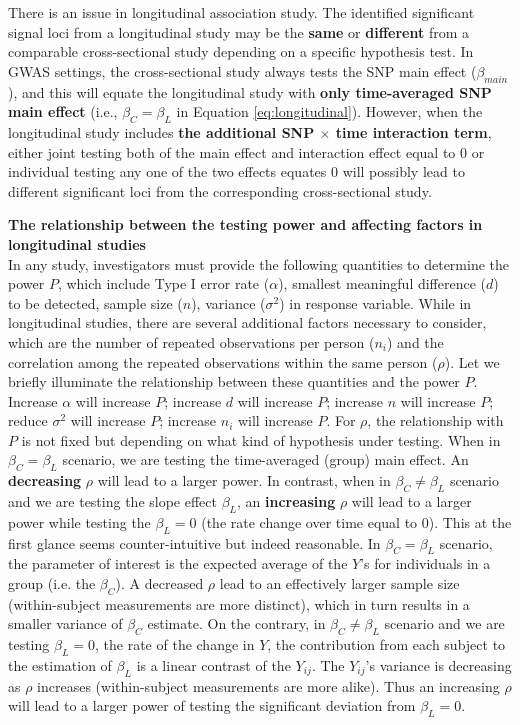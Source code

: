 \documentclass[12pt]{article}
\begin{document}
There is an issue in longitudinal association study. The identified significant signal loci from a longitudinal study may be the \textbf{same} or \textbf{different} from a comparable cross-sectional study depending on a specific hypothesis test. In GWAS settings, the cross-sectional study always tests the SNP main effect ($\beta_{main}$), and this will equate the longitudinal study with \textbf{only time-averaged SNP main effect} (i.e., $\beta_C = \beta_L$ in Equation \ref{eq:longitudinal}). However, when the longitudinal study includes \textbf{the additional SNP $\times$ time interaction term}, either joint testing both of the main effect and interaction effect equal to 0 or individual testing any one of the two effects equates 0 will possibly lead to different significant loci from the corresponding cross-sectional study.

\textbf{The relationship between the testing power and affecting factors in longitudinal studies}\\
In any study, investigators must provide the following quantities to determine the power $P$, which include Type I error rate ($\alpha$), smallest meaningful difference ($d$) to be detected, sample size ($n$), variance ($\sigma^2$) in response variable. While in longitudinal studies, there are several additional factors necessary to consider, which are the number of repeated observations per person ($n_i$) and the correlation among the repeated observations within the same person ($\rho$). Let we briefly illuminate the relationship between these quantities and the power $P$. Increase $\alpha$ will increase $P$; increase $d$ will increase $P$; increase $n$ will increase $P$; reduce $\sigma^2$ will increase $P$; increase $n_i$ will increase $P$. For $\rho$, the relationship with $P$ is not fixed but depending on what kind of hypothesis under testing. When in $\beta_C = \beta_L$ scenario, we are testing the time-averaged (group) main effect. An \textbf{decreasing} $\rho$ will lead to a larger power. In contrast, when in $\beta_C \neq \beta_L$ scenario and we are testing the slope effect $\beta_L$, an \textbf{increasing} $\rho$ will lead to a larger power while testing the $\beta_L = 0$ (the rate change over time equal to 0). This at the first glance seems counter-intuitive but indeed reasonable. In $\beta_C = \beta_L$ scenario, the parameter of interest is the expected average of the $Y$'s for individuals in a group (i.e. the $\beta_C$). A decreased $\rho$ lead to an effectively larger sample size (within-subject measurements are more distinct), which in turn results in a smaller variance of $\beta_C$ estimate. On the contrary, in $\beta_C \neq \beta_L$ scenario and we are testing $\beta_L = 0$, the rate of the change in $Y$, the contribution from each subject to the estimation of $\beta_L$ is a linear contrast of the $Y_{ij}$. The $Y_{ij}$'s variance is decreasing as $\rho$ increases (within-subject measurements are more alike). Thus an increasing $\rho$ will lead to a larger power of testing the significant deviation from $\beta_L = 0$.
\end{document}
